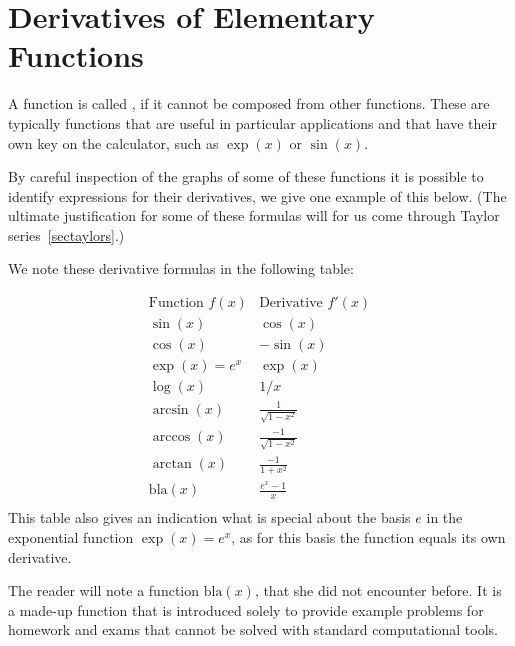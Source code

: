 \section{Derivatives of Elementary Functions}
\label{derelem}

A function is called , if it
cannot be composed from other functions. These are typically functions
that are useful in particular applications and that have their own key on the calculator, such as $\exp(x)$ or $\sin(x)$.

By careful inspection of the graphs of some of these functions it is possible
to identify expressions for their derivatives, we give one example of this
below. (The ultimate justification
for some of these formulas will for us come through Taylor
series~\ref{sectaylors}.)

We note these derivative formulas in the following table:

\[
\begin{array}{c|c}
\mbox{Function $f(x)$}&\mbox{Derivative $f'(x)$}\\
\hline
\sin(x)&\cos(x)\\
\cos(x)&-\sin(x)\\
\exp(x)=e^x&\exp(x)\\
\log(x)&1/x\\
\arcsin(x)&\frac{1}{\sqrt{1-x^2}}\\
\arccos(x)&\frac{-1}{\sqrt{1-x^2}}\\
\arctan(x)&\frac{-1}{1+x^2}\\
\mbox{bla}(x)&\frac{e^x-1}{x}\\
\end{array}
\]
This table also gives an indication what is special about the basis $e$ in
the exponential function $\exp(x)=e^x$, as for this basis the function equals
its own derivative.

\begin{note}
The reader will note a function $\mbox{bla}(x)$, that she did not
encounter before. It is a made-up function that is introduced solely to
provide example problems for homework and exams that cannot be solved with standard
computational tools.
\end{note}

